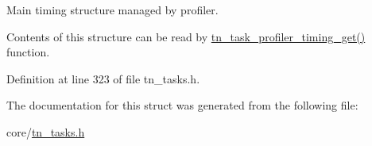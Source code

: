 Main timing structure managed by profiler. 

Contents of this structure can be read by {\ttfamily \hyperlink{tn__tasks_8h_a8f90a88f54d2d49bb1de00886241edfe}{tn\+\_\+task\+\_\+profiler\+\_\+timing\+\_\+get()}} function. 

Definition at line 323 of file tn\+\_\+tasks.\+h.



The documentation for this struct was generated from the following file\+:\begin{DoxyCompactItemize}
\item 
core/\hyperlink{tn__tasks_8h}{tn\+\_\+tasks.\+h}\end{DoxyCompactItemize}

